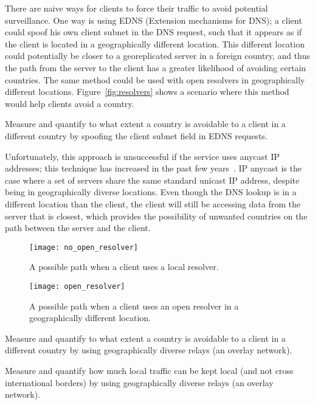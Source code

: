 There are naive ways for clients to force their traffic to avoid potential surveillance.  One way is using EDNS (Extension mechanisms for DNS); a client could spoof his own client subnet in the DNS request, such that it appears as if the client is located in a geographically different location.  This different location could potentially be closer to a georeplicated server in a foreign country, and thus the path from the server to the client has a greater likelihood of avoiding certain countries.  The same method could be used with open resolvers in geographically different locations.  Figure~\ref{fig:resolvers} shows a scenario where this method would help clients avoid a country.  

\begin{thm}
Measure and quantify to what extent a country is avoidable to a client in a different country by spoofing the client subnet field in EDNS requests.
\end{thm}

Unfortunately, this approach is unsuccessful if the service uses anycast IP addresses; this technique has increased in the past few years~\cite{cicalese2015characterizing}.  IP anycast is the case where a set of servers share the same standard unicast IP address, despite being in geographically diverse locations.  Even though the DNS lookup is in a different location than the client, the client will still be accessing data from the server that is closest, which provides the possibility of unwanted countries on the path between the server and the client.  

\begin{figure*}
\centering
\begin{subfigure}[t]{.5\textwidth}
  \centering
  \texttt{[image: no\_open\_resolver]}
  \caption{A possible path when a client uses a local resolver.}
  \label{fig:local_resolver}
\end{subfigure}%
\begin{subfigure}[t]{.5\textwidth}
  \centering
  \texttt{[image: open\_resolver]}
  \caption{A possible path when a client uses an open resolver in a geographically different location.}
  \label{fig:open_resolver}
\end{subfigure}%
\caption{Different paths are shown when a client uses a local resolver (Figure~\ref{fig:local_resolver}) vs. a geographically distant open resolver (Figure~\ref{fig:open_resolver}.)}
\label{fig:resolvers}
\end{figure*}

\begin{thm}
Measure and quantify to what extent a country is avoidable to a client in a different country by using geographically diverse relays (an overlay network).
\end{thm}

\begin{thm}
Measure and quantify how much local traffic can be kept local (and not cross international borders) by using geographically diverse relays (an overlay network).
\end{thm}

